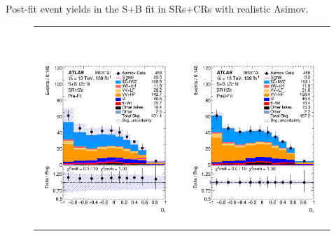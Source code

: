 \begin{table}[]
	\centering
	\tiny
	
	\caption{Post-fit event yields in the S+B \tZc fit in SRs+CRs with realistic Asimov. \TabErrStatSys} 
	\label{tab:stat:tzc:splusb:crsr:yields:postfit}
\end{table} 
\clearpage
\FloatBarrier

\clearpage
\begin{figure}[htbp]
	\centering
	\begin{tabular}{cc}
		\includegraphics[width=.45\textwidth]{Chapters/CH8/figures/SPLUSB_CRSR_UsingDL1rcFullSys/Plots/SR1} &
		\includegraphics[width=.45\textwidth]{Chapters/CH8/figures/SPLUSB_CRSR_UsingDL1rcFullSys/Plots/SR1_postFit} \\

\end{tabular}
\end{figure}
